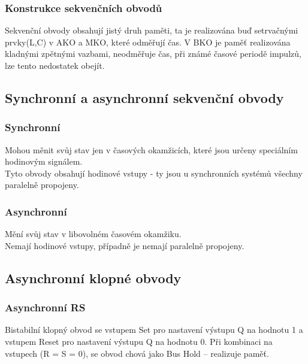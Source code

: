 \subsubsection{Konstrukce sekvenčních obvodů}
Sekvenční obvody obsahují jistý druh paměti, ta je realizována buď setrvačnými prvky(L,C) v AKO a MKO, které odměřují čas. V BKO je paměť realizována kladnými zpětnými vazbami, neodměřuje čas, při známé časové periodě impulzů, lze tento nedostatek obejít.\\

\subsection{Synchronní a asynchronní sekvenční obvody}
\subsubsection{Synchronní}
Mohou měnit svůj stav jen v časových okamžicích, které jsou určeny speciálním hodinovým signálem.\\
Tyto obvody obsahují hodinové vstupy - ty jsou u synchronních systémů všechny paralelně propojeny.\\
\subsubsection{Asynchronní}
Mění svůj stav v libovolném časovém okamžiku.\\
Nemají hodinové vstupy, případně je nemají paralelně propojeny.\\

\subsection{Asynchronní klopné obvody}
\subsubsection{Asynchronní RS}
Bistabilní klopný obvod se vstupem Set pro nastavení výstupu Q na hodnotu 1 a vstupem Reset pro nastavení výstupu Q na hodnotu 0. Při kombinaci na vstupech (R = S = 0), se obvod chová jako Bus Hold – realizuje paměť.\\

